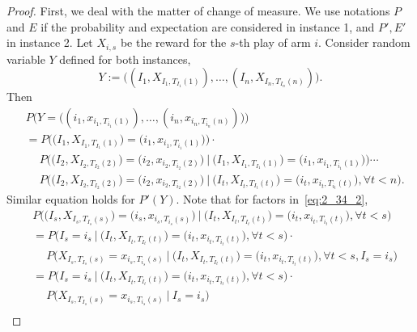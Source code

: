 \begin{proof}
    First, we deal with the matter of change of measure.
    We use notations $P$ and $E$ if the probability and expectation are considered
    in instance 1, and $P', E'$ in instance 2.
    Let $X_{i,s}$ be the reward for the $s$-th play of arm $i$.
    Consider random variable $Y$ defined for both instances,
    \begin{equation}
        Y := \big((I_1, X_{I_1, T_{I_1}(1)}),\dots,(I_n, X_{I_n, T_{I_n}(n)})\big).
    \end{equation}
    Then
    \begin{equation}
    \begin{split}
        &P\Big(Y=\big((i_1, x_{i_1, T_{i_1}(1)}),\dots,(i_n, x_{i_n, T_{i_n}(n)})\big)\Big) \\
            &= P\Big(\big(I_1, X_{I_1, T_{I_1}(1)}\big)=\big(i_1, x_{i_1, T_{i_1}(1)}\big)\Big) \cdot \\
            &\quad~  P\Big(\big(I_2, X_{I_2, T_{I_2}(2)}\big)=\big(i_2, x_{i_2, T_{i_2}(2)}\big)~\Big|~
                \big(I_1, X_{I_1, T_{I_1}(1)}\big)=\big(i_1, x_{i_1, T_{i_1}(1)}\big)\Big) \cdots \\
            &\quad~  P\Big(\big(I_2, X_{I_2, T_{I_2}(2)}\big)=\big(i_2, x_{i_2, T_{i_2}(2)}\big)~\Big|~
                \big(I_t, X_{I_t, T_{I_t}(t)}\big)=\big(i_t, x_{i_t, T_{i_t}(t)}\big), \forall t<n\Big). \label{eq:2_34_2}
    \end{split}
    \end{equation}
    Similar equation holds for $P'(Y)$.
    Note that for factors in~\eqref{eq:2_34_2},
    \begin{equation}
        \begin{split}
            &P\Big(\big(I_s, X_{I_s, T_{I_s}(s)}\big)=\big(i_s, x_{i_s, T_{i_s}(s)}\big)~\Big|~
            \big(I_t, X_{I_t, T_{I_t}(t)}\big)=\big(i_t, x_{i_t, T_{i_t}(t)}\big), \forall t<s\Big) \\
            &=P\Big(I_s=i_s~\Big|~
            \big(I_t, X_{I_t, T_{I_t}(t)}\big)=\big(i_t, x_{i_t, T_{i_t}(t)}\big), \forall t<s\Big) \cdot \\
            &\quad~P\Big(X_{I_s, T_{I_s}(s)}=x_{i_s, T_{i_s}(s)}~\Big|~
            \big(I_t, X_{I_t, T_{I_t}(t)}\big)=\big(i_t, x_{i_t, T_{i_t}(t)}\big), \forall t<s, I_s=i_s\Big) \\
            &=P\Big(I_s=i_s~\Big|~
            \big(I_t, X_{I_t, T_{I_t}(t)}\big)=\big(i_t, x_{i_t, T_{i_t}(t)}\big), \forall t<s\Big) \cdot \\
            &\quad~P\Big(X_{I_s, T_{I_s}(s)}=x_{i_s, T_{i_s}(s)}~\Big|~I_s=i_s\Big) \\

\end{split}
\end{equation}
\end{proof}
